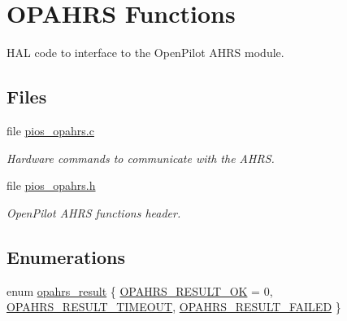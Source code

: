 \hypertarget{group___p_i_o_s___o_p_a_h_r_s}{\section{\-O\-P\-A\-H\-R\-S \-Functions}
\label{group___p_i_o_s___o_p_a_h_r_s}
}


\-H\-A\-L code to interface to the \-Open\-Pilot \-A\-H\-R\-S module.  


\subsection*{\-Files}
\begin{DoxyCompactItemize}
\item 
file \hyperlink{pios__opahrs_8c}{pios\-\_\-opahrs.\-c}
\begin{DoxyCompactList}\small\item\em \-Hardware commands to communicate with the \-A\-H\-R\-S. \end{DoxyCompactList}\item 
file \hyperlink{pios__opahrs_8h}{pios\-\_\-opahrs.\-h}
\begin{DoxyCompactList}\small\item\em \-Open\-Pilot \-A\-H\-R\-S functions header. \end{DoxyCompactList}\end{DoxyCompactItemize}
\subsection*{\-Enumerations}
\begin{DoxyCompactItemize}
\item 
enum \hyperlink{group___p_i_o_s___o_p_a_h_r_s_gaf6fe64d28ea92983e870494d0a5d05bd}{opahrs\-\_\-result} \{ \hyperlink{group___p_i_o_s___o_p_a_h_r_s_ggaf6fe64d28ea92983e870494d0a5d05bda20bc9bd773d44f8ef0af8b40151b6349}{\-O\-P\-A\-H\-R\-S\-\_\-\-R\-E\-S\-U\-L\-T\-\_\-\-O\-K} =  0, 
\hyperlink{group___p_i_o_s___o_p_a_h_r_s_ggaf6fe64d28ea92983e870494d0a5d05bda892b46cfe463af918c421464c2809545}{\-O\-P\-A\-H\-R\-S\-\_\-\-R\-E\-S\-U\-L\-T\-\_\-\-T\-I\-M\-E\-O\-U\-T}, 
\hyperlink{group___p_i_o_s___o_p_a_h_r_s_ggaf6fe64d28ea92983e870494d0a5d05bda7952eace857150eede21d18910af8239}{\-O\-P\-A\-H\-R\-S\-\_\-\-R\-E\-S\-U\-L\-T\-\_\-\-F\-A\-I\-L\-E\-D}
 \}
\end{DoxyCompactItemize}
